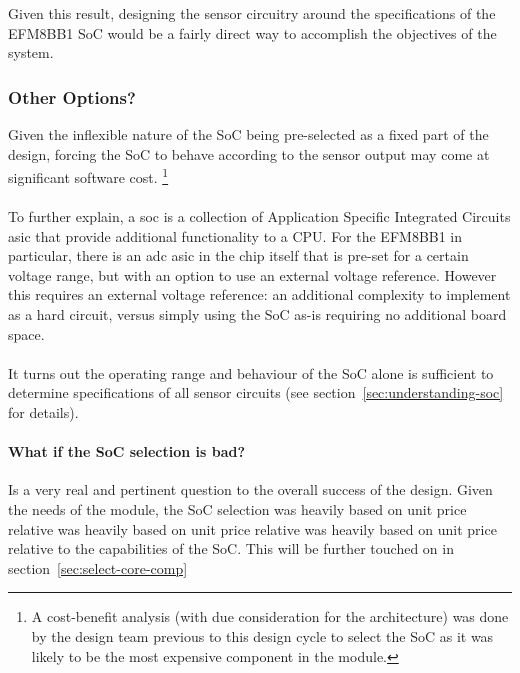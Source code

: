 \documentclass[12pt]{article}
\begin{document}
  Given this result, designing the sensor circuitry around the specifications of the EFM8BB1 SoC would be a fairly direct way to accomplish the objectives of the system.
  
    \subsubsection{Other Options?}
    Given the inflexible nature of the SoC being pre-selected as a fixed part of the design, forcing the SoC to behave according to the sensor output may come at significant software cost. \footnote{A cost-benefit analysis (with due consideration for the architecture) was done by the design team previous to this design cycle to select the SoC as it was likely to be the most expensive component in the module.}
  
    \paragraph{}
    To further explain, a \acrlong{soc} is a collection of Application Specific Integrated Circuits \acrshort{asic} that provide additional functionality to a CPU. For the EFM8BB1 in particular, there is an \acrfull{adc} \acrshort{asic} in the chip itself that is pre-set for a certain voltage range, but with an option to use an external voltage reference. However this requires an external voltage reference: an additional complexity to implement as a hard circuit, versus simply using the SoC as-is requiring no additional board space.

    \paragraph{}
    It turns out the operating range and behaviour of the SoC alone is sufficient to determine specifications of all sensor circuits (see section~\ref{sec:understanding-soc} for details). 

    \paragraph{What if the SoC selection is bad?}
    Is a very real and pertinent question to the overall success of the design. Given the needs of the module, the SoC selection was heavily based on unit price relative was heavily based on unit price relative was heavily based on unit price relative to the capabilities of the SoC. This will be further touched on in section~\ref{sec:select-core-comp}
\end{document}
